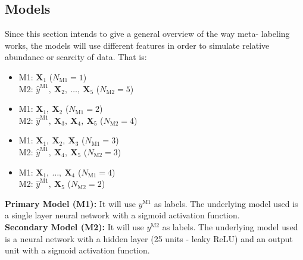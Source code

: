 \documentclass[a4paper]{article}
\begin{document}
\subsection{Models}
Since this section intends to give a general overview of the way meta-
labeling works, the models will use different features in order to 
simulate relative abundance or scarcity of data. That is:

\begin{itemize}
	\item M1: $\textbf{X}_1$ \hfill 
	($N_\text{M1} = 1$) 	\hspace{0.5\textwidth} \\
	M2: $\hat{y}^{\text{M1}},\ \textbf{X}_2,\ \ldots,\ \textbf{X}_5$ 
	\hfill ($N_\text{M2} = 5$) \hspace{0.5\textwidth}
	
	\item M1: $\textbf{X}_1,\ \textbf{X}_2$ \hfill
	($N_\text{M1} = 2$) \hspace{0.5\textwidth} \\
	M2: $\hat{y}^{\text{M1}},\ \textbf{X}_3,\ \textbf{X}_4,\ 
	\textbf{X}_5$ 
	\hfill ($N_\text{M2} = 4$) \hspace{0.5\textwidth}
	
	\item M1: $\textbf{X}_1,\ \textbf{X}_2,\ \textbf{X}_3$ \hfill 
	($N_\text{M1} = 3$) \hspace{0.5\textwidth} \\
	M2: $\hat{y}^{\text{M1}},\ \textbf{X}_4,\ \textbf{X}_5$ 
	\hfill ($N_\text{M2} = 3$) \hspace{0.5\textwidth}
	
	\item M1: $\textbf{X}_1,\ \ldots,\ \textbf{X}_4$ \hfill
	($N_\text{M1} = 4$) \hspace{0.5\textwidth} \\
	M2: $\hat{y}^{\text{M1}},\ \textbf{X}_5$ 
	\hfill ($N_\text{M2} = 2$) \hspace{0.5\textwidth} \\
\end{itemize}

\textbf{Primary Model (M1):} It will use $y^{\text{M1}}$ as labels. 
The underlying model used is a single layer neural network with a 
sigmoid activation function.\\

\vspace{.1cm}
\noindent
\textbf{Secondary Model (M2):} It will use $y^{\text{M2}}$ as labels. 
The underlying model used is a neural network with a hidden layer (25 
units - leaky ReLU) and an output unit with a sigmoid activation 
function.\\
\end{document}

